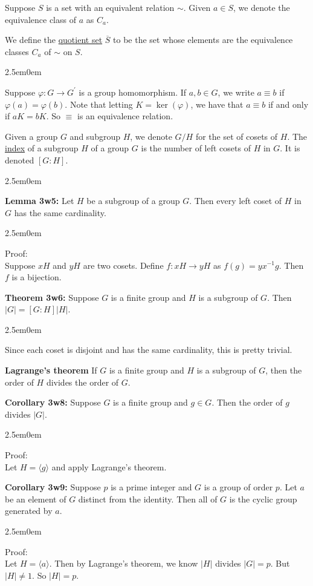 \documentclass{book}
\newcommand{\hOne}{%
   \color{Black}%
   \fontsize{14}{16}\selectfont%
}
\newcommand{\hTwo}{%
\color{MidnightBlue}%
   \fontsize{13}{15}\selectfont%
}
\newcommand{\hThree}{%
   \color{PineGreen!85!Orange}
   \fontsize{12}{14}\selectfont%
}
\newenvironment{myIndent}{%
   \begin{adjustwidth}{2.5em}{0em}%
}{%
   \end{adjustwidth}%
}
\newcommand{\udefine}[1]{{%
   \setulcolor{Red}%
   \setul{0.14em}{0.07em}%
   \ul{#1}%
}}
\newcommand{\blab}[1]{\textbf{#1}}
\newcommand{\retTwo}{\hfill\bigbreak}
\begin{document}
\hOne 
Suppose $S$ is a set with an equivalent relation $\sim$. Given $a \in S$, we denote the\\ equivalence class of $a$ as $C_a$.\retTwo

We define the \udefine{quotient set} $\overline{S}$ to be the set whose elements are the equivalence classes $C_a$ of $\sim$ on $S$.\retTwo

\begin{myIndent}\hTwo
	Suppose $\varphi: G \longrightarrow G^\prime$ is a group homomorphism. If $a, b \in G$, we write $a \equiv b$ if $\varphi(a) = \varphi(b)$. Note that letting $K = \ker(\varphi)$, we have that $a \equiv b$ if and only if $aK = bK$. So $\equiv$ is an equivalence relation.\newpage 
\end{myIndent}

Given a group $G$ and subgroup $H$, we denote $G/H$ for the set of cosets of $H$. The \udefine{index} of a subgroup $H$ of a group $G$ is the number of left cosets of $H$ in $G$. It is denoted $[G: H]$.

\begin{myIndent}\hTwo
	\blab{Lemma 3w5:} Let $H$ be a subgroup of a group $G$. Then every left coset of $H$ in $G$ has the same cardinality.
	\begin{myIndent}\hThree
		Proof:\\
		Suppose $xH$ and $yH$ are two cosets. Define $f: xH \longrightarrow yH$ as $f(g) = yx^{-1}g$. Then $f$ is a bijection.\retTwo
	\end{myIndent}

	\blab{Theorem 3w6:} Suppose $G$ is a finite group and $H$ is a subgroup of $G$. Then\\ $|G| = [G:H]|H|$.
	
	\begin{myIndent}\hThree
		Since each coset is disjoint and has the same cardinality, this is pretty trivial.\retTwo
	\end{myIndent}

	\blab{Lagrange's theorem} If $G$ is a finite group and $H$ is a subgroup of $G$, then the order of $H$ divides the order of $G$.\retTwo

	\blab{Corollary 3w8:} Suppose $G$ is a finite group and $g \in G$. Then the order of $g$ divides $|G|$.
	
	\begin{myIndent}\hThree
		Proof:\\
		Let $H = \langle g \rangle$ and apply Lagrange's theorem.\retTwo
	\end{myIndent}

	\blab{Corollary 3w9:} Suppose $p$ is a prime integer and $G$ is a group of order $p$. Let $a$ be an element of $G$ distinct from the identity. Then all of $G$ is the cyclic group generated by $a$.

	\begin{myIndent}\hThree
		Proof:\\
		Let $H = \langle a \rangle$. Then by Lagrange's theorem, we know $|H|$ divides $|G| = p$. But $|H| \neq 1$. So $|H| = p$.\retTwo
	\end{myIndent}
\end{myIndent}
\end{document}
